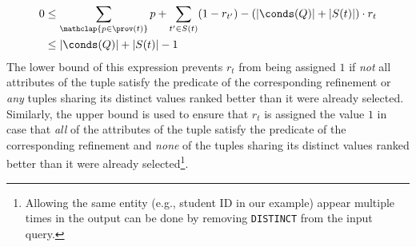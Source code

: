 \begin{align}
\begin{split}
0 &\leq \sum_{\mathclap{p \in \prov(t)}} p + \sum_{t' \in S(t)} (1 - r_{t'}) - (|\conds(Q)| + |S(t)|) \cdot r_t \label{eq:tuple_in_ranking_inline} \\
  &\leq |\conds(Q)| + |S(t)| - 1
\end{split}
\end{align}
The lower bound of this expression prevents $r_t$ from being assigned $1$ if {\it not} all attributes of the tuple satisfy the predicate of the corresponding refinement or {\it any} tuples sharing its distinct values ranked better than it were already selected. Similarly, the upper bound is used to ensure that $r_t$ is assigned the value $1$ in case that {\it all} of the attributes of the tuple satisfy the predicate of the corresponding refinement and {\it none} of the tuples sharing its distinct values ranked better than it were already selected\footnote{Allowing the same entity (e.g., student ID in our example) appear multiple times in the output can be done by removing {\tt DISTINCT} from the input query.}.

